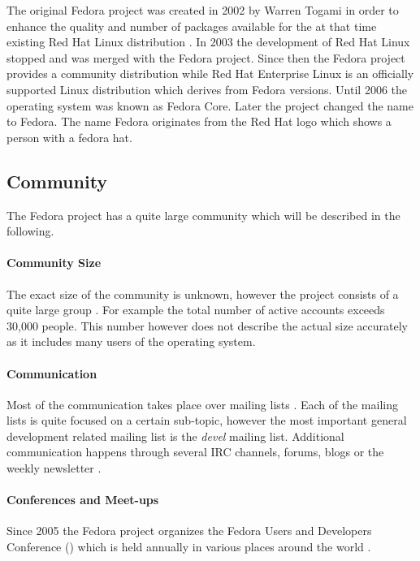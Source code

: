 The original Fedora project was created in 2002 by Warren Togami in order to
enhance the quality and number of packages available for the at that time
existing Red Hat Linux distribution
\cite{FedoraAbout,FedoraTogami,FedoraHistoricalSchedules}. In 2003 the
development of Red Hat Linux stopped and was merged with the Fedora project.
Since then the Fedora project provides a community distribution while Red Hat
Enterprise Linux is an officially supported Linux distribution which derives
from Fedora versions. Until 2006 the operating system was known as Fedora Core.
Later the project changed the name to Fedora. The name Fedora originates from
the Red Hat logo which shows a person with a fedora hat.

\subsection{Community}

The Fedora project has a quite large community which will be described in the
following.

\paragraph{Community Size}

The exact size of the community is unknown, however the project consists of a
quite large group \cite{FedoraStatistics}. For example the total number of
active accounts exceeds 30,000 people. This number however does not describe
the actual size accurately as it includes many users of the operating system.

\paragraph{Communication}

Most of the communication takes place over mailing lists
\cite{FedoraAbout,FedoraJoin,FedoraSIG}. Each of the mailing lists is quite
focused on a certain sub-topic, however the most important general development
related mailing list is the \emph{devel} mailing list. Additional communication
happens through several \ac{IRC} channels, forums, blogs or the weekly
newsletter \cite{FedoraFWN,FedoraCommunicating}.

\paragraph{Conferences and Meet-ups}

Since 2005 the Fedora project organizes the Fedora Users and Developers
Conference () which is held annually in various places
around the world \cite{FedoraFUDCon}.

